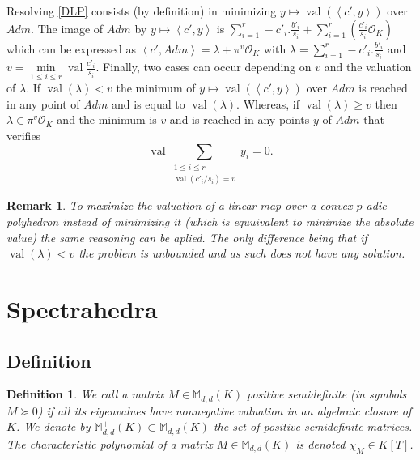 \documentclass[a4paper,12pt]{article}
\newtheorem{definition}{Definition}
\newtheorem{remark}{Remark}
\newcommand{\allmat}{\mathbb{M}} %
\DeclareMathOperator{\val}{val}
\newcommand{\OK}{\mathcal{O}_K}
\begin{document}
Resolving \ref{DLP} consists (by definition) in minimizing $y \mapsto \val\left(\left<c',y \right>\right)$ over $Adm$. The image of $Adm$ by $y \mapsto \left<c',y \right>$ is $\sum_{i=1}^r -c'_i.\frac{b'_i}{s_i} + \sum_{i=1}^r\left( \frac{c'_i}{s_{i}} \OK \right)$ which can be expressed as $\left<c',Adm \right> = \lambda + \pi^{v} \OK$ with $\lambda = \sum_{i=1}^r -c'_i.\frac{b'_i}{s_i}$ and $v = \min\limits_{1\le i\le r} \val \frac{c'_{i}}{s_{i}} $.
Finally, two cases can occur depending on $v$ and the valuation of $\lambda$. If $\val( \lambda) < v$ the minimum of $y\mapsto \val\left(\left<c',y \right>\right)$ over $Adm$ is reached in any point of $Adm$ and is equal to $\val\left( \lambda\right)$. Whereas, if $\val\left( \lambda \right) \ge v$ then $\lambda \in \pi^{v} \OK$ and the minimum is $v $ and is reached in any points $y$ of $Adm$ that verifies 
	\[\val \underset{ \begin{array}{c} 1\le i\le r\\ \val\left(c'_{i}/{s_{i}} \right) = v  \end{array}}{\sum} y_{i} = 0. \]

\begin{remark}
	To maximize the valuation of a linear map over a convex $p$-adic polyhedron instead of minimizing it (which is equuivalent to minimize the absolute value) the same reasoning can be aplied. The only difference being that if $\val\left( \lambda\right) < v$ the problem is unbounded and as such does not have any solution. 
\end{remark}




\section{Spectrahedra}

\subsection{Definition}
\newcommand\Mat{Positive semidefinite matrix }
\newcommand\mats{positive semidefinite matrices }
\newcommand\Mats{positive semidefinite matrices }

\begin{definition}
  We call a matrix $M \in \allmat_{d,d}(K)$ \emph{positive semidefinite} (in symbols $M \succeq 0$)
  if all its eigenvalues have nonnegative valuation in an algebraic closure of $K$.
  We denote by $\allmat_{d,d}^+(K) \subset \allmat_{d,d}(K)$ the set of positive semidefinite matrices.
  The characteristic polynomial of a matrix $M \in \allmat_{d,d}(K)$ is denoted $\chi_M \in K[T]$.
\end{definition}
\end{document}
